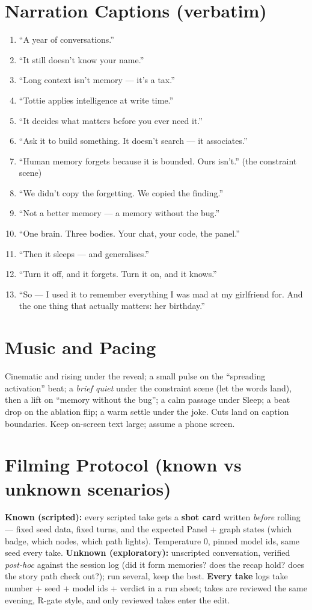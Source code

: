 \section{Narration Captions (verbatim)}
\begin{enumerate}
  \item ``A year of conversations.''
  \item ``It still doesn't know your name.''
  \item ``Long context isn't memory --- it's a tax.''
  \item ``Tottie applies intelligence at write time.''
  \item ``It decides what matters before you ever need it.''
  \item ``Ask it to build something. It doesn't search --- it associates.''
  \item ``Human memory forgets because it is bounded. Ours isn't.'' (the constraint scene)
  \item ``We didn't copy the forgetting. We copied the finding.''
  \item ``Not a better memory --- a memory without the bug.''
  \item ``One brain. Three bodies. Your chat, your code, the panel.''
  \item ``Then it sleeps --- and generalises.''
  \item ``Turn it off, and it forgets. Turn it on, and it knows.''
  \item ``So --- I used it to remember everything I was mad at my girlfriend for. And the one thing that actually matters: her birthday.''
\end{enumerate}

\section{Music and Pacing}
Cinematic and rising under the reveal; a small pulse on the ``spreading activation'' beat; a
\emph{brief quiet} under the constraint scene (let the words land), then a lift on ``memory without the
bug''; a calm passage under Sleep; a beat drop on the ablation flip; a warm settle under the joke.
Cuts land on caption boundaries. Keep on-screen text large; assume a phone screen.

\section{Filming Protocol (known vs unknown scenarios)}
\textbf{Known (scripted):} every scripted take gets a \textbf{shot card} written \emph{before}
rolling --- fixed seed data, fixed turns, and the expected Panel + graph states (which badge,
which nodes, which path lights). Temperature 0, pinned model ids, same seed every take.
\textbf{Unknown (exploratory):} unscripted conversation, verified \emph{post-hoc} against the
session log (did it form memories? does the recap hold? does the story path check out?); run
several, keep the best. \textbf{Every take} logs take number + seed + model ids + verdict in a
run sheet; takes are reviewed the same evening, R-gate style, and only reviewed takes enter the
edit.

